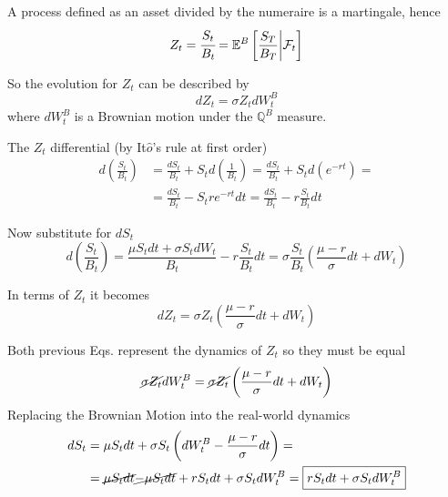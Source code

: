 \documentclass{beamer}
\begin{document}
\begin{frame}{}
A process defined as an asset divided by the numeraire is a martingale, hence
\begin{equation*}
Z_t = \cfrac{S_t}{B_t} = \mathbb{E}^{B}\left[\frac{S_T}{B_T}\bigg|\mathcal{F}_t\right]
\end{equation*}

So the evolution for $Z_t$ can be described by
\begin{equation*}
dZ_t = \sigma Z_t dW_t^B
\end{equation*}
where $dW_t^B$ is a Brownian motion under the $\mathbb{Q}^B$ measure.

The $Z_t$ differential (by It$\hat{o}$'s rule at first order)
\begin{equation*}
\begin{aligned}
d\left(\frac{S_t}{B_t}\right) &= \frac{dS_t}{B_t} + S_t d\left(\frac{1}{B_t}\right) =
\frac{dS_t}{B_t} + S_t d\left(e^{-rt}\right) = \\
&= \frac{dS_t}{B_t} - S_t re^{-rt}dt = \frac{dS_t}{B_t} - r\frac{S_t}{B_t}dt 
\end{aligned}
\end{equation*}
\end{frame}

\begin{frame}
Now substitute for $dS_t$
\begin{equation*}
d\left(\frac{S_t}{B_t}\right)= \frac{ \mu S_t dt + \sigma S_t dW_t}{B_t} - r\frac{S_t}{B_t}dt = \sigma\frac{S_t}{B_t}\left(\frac{\mu - r}{\sigma}dt + dW_t \right)
\end{equation*}	

In terms of $Z_t$ it becomes
\begin{equation*}
dZ_t = \sigma Z_t\left(\frac{\mu - r}{\sigma}dt + dW_t \right)
\end{equation*}

Both previous Eqs. represent the dynamics of $Z_t$ so they must be equal
\begin{equation*}
\cancel{\sigma Z_t}dW_t^B = \cancel{\sigma Z_t}\left(\frac{\mu - r}{\sigma}dt + dW_t\right)
\end{equation*}
Replacing the Brownian Motion into the real-world dynamics
\begin{equation*}
\begin{aligned}
dS_t &= \mu S_t dt + \sigma S_t \left(dW_t^B - \frac{\mu - r}{\sigma}dt\right) =\\
& = \cancel{\mu S_t dt} \cancel{-\mu S_t dt} + rS_t dt + \sigma S_t dW_t^B  = \boxed{rS_t dt + \sigma S_t dW_t^B}
\end{aligned}
\end{equation*}
\end{frame}
\end{document}

